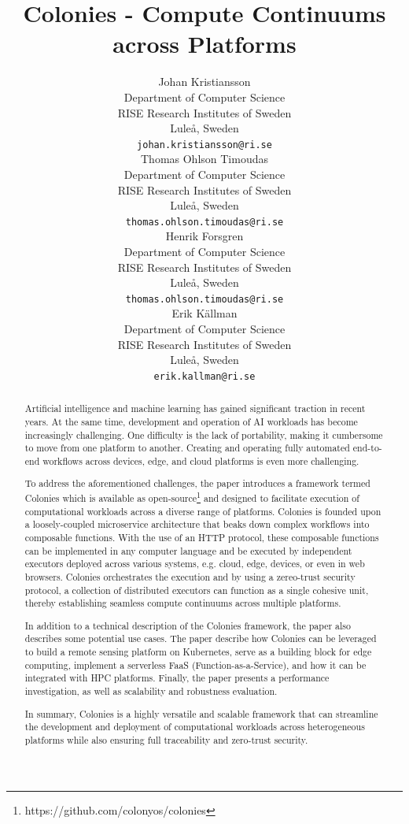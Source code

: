 \documentclass{article}
\title{Colonies - Compute Continuums across Platforms}
\author{{\hspace{1mm}Johan Kristiansson} \\
	Department of Computer Science \\
	RISE Research Institutes of Sweden \\
	Luleå, Sweden \\
	\texttt{johan.kristiansson@ri.se} \\
	\And
	{\hspace{1mm}Thomas Ohlson Timoudas} \\
	Department of Computer Science \\
	RISE Research Institutes of Sweden \\
	Luleå, Sweden \\
	\texttt{thomas.ohlson.timoudas@ri.se} \\
	\And
	{\hspace{1mm}Henrik Forsgren} \\
	Department of Computer Science \\
	RISE Research Institutes of Sweden \\
	Luleå, Sweden \\
	\texttt{thomas.ohlson.timoudas@ri.se} \\
	\And
	{\hspace{1mm}Erik Källman} \\
	Department of Computer Science \\
	RISE Research Institutes of Sweden \\
	Luleå, Sweden \\
	\texttt{erik.kallman@ri.se} \\
}
\begin{document}
\maketitle

\begin{abstract}
Artificial intelligence and machine learning has gained significant traction in recent years. At the same time, development and operation of AI workloads has become increasingly challenging. One difficulty is the lack of portability, making it cumbersome to move from one platform to another. Creating and operating fully automated end-to-end workflows across devices, edge, and cloud platforms is even more challenging.

To address the aforementioned challenges, the paper introduces a framework termed Colonies which is available as open-source\footnote{https://github.com/colonyos/colonies} and designed to facilitate execution of computational workloads across a diverse range of platforms. Colonies is founded upon a loosely-coupled microservice architecture that beaks down complex workflows into composable functions. With the use of an HTTP protocol, these composable functions can be implemented in any computer language and be executed by independent executors deployed across various systems, e.g. cloud, edge, devices, or even in web browsers. Colonies orchestrates the execution and by using a zereo-trust security protocol, a collection of distributed executors can function as a single cohesive unit, thereby establishing seamless compute continuums across multiple platforms.

In addition to a technical description of the Colonies framework, the paper also describes some potential use cases. The paper describe how Colonies can be leveraged to build a remote sensing platform on Kubernetes, serve as a building block for edge computing, implement a serverless FaaS (Function-as-a-Service), and how it can be integrated with HPC platforms. Finally, the paper presents a performance investigation, as well as scalability and robustness evaluation. 

In summary, Colonies is a highly versatile and scalable framework that can streamline the development and deployment of computational workloads across heterogeneous platforms while also ensuring full traceability and zero-trust security.
\end{abstract}

\end{document}
